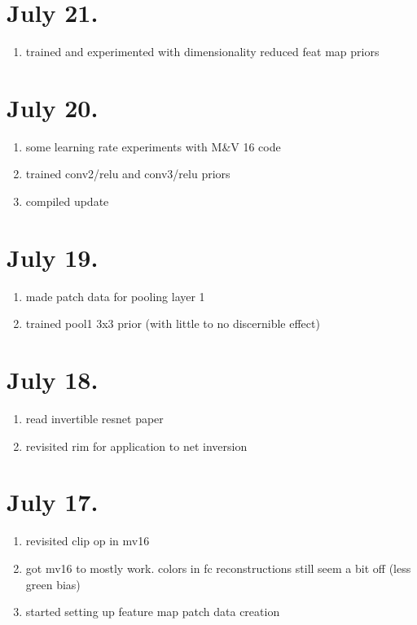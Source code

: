 \documentclass{article}
\begin{document}
\section*{July 21.}

\begin{enumerate}
	\item trained and experimented with dimensionality reduced feat map priors
\end{enumerate}


\section*{July 20.}

\begin{enumerate}
	\item some learning rate experiments with M\&V 16 code
	\item trained conv2/relu and conv3/relu priors
	\item compiled update
\end{enumerate}


\section*{July 19.}

\begin{enumerate}
	\item made patch data for pooling layer 1
	\item trained pool1 3x3 prior (with little to no discernible effect)
\end{enumerate}


\section*{July 18.}

\begin{enumerate}
	\item read invertible resnet paper
	\item revisited rim for application to net inversion
\end{enumerate}



\section*{July 17.}

\begin{enumerate}
	\item revisited clip op in mv16
	\item got mv16 to mostly work. colors in fc reconstructions still seem a bit off (less green bias)
	\item started setting up feature map patch data creation
\end{enumerate}
\end{document}

